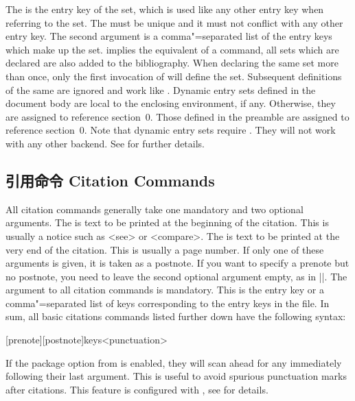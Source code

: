 \begin{ltxsyntax}

\BiberOnlyMark

The  is the entry key of the set, which is used like any other entry key when referring to the set. The  must be unique and it must not conflict with any other entry key. The second argument is a comma"=separated list of the entry keys which make up the set.  implies the equivalent of a  command, \ie all sets which are declared are also added to the bibliography. When declaring the same set more than once, only the first invocation of  will define the set. Subsequent definitions of the same  are ignored and work like . Dynamic entry sets defined in the document body are local to the enclosing  environment, if any. Otherwise, they are assigned to reference section~0. Those defined in the preamble are assigned to reference section~0. Note that dynamic entry sets require \biber. They will not work with any other backend. See  for further details.

\end{ltxsyntax}

\subsection{引用命令 Citation Commands}
\label{use:cit}

All citation commands generally take one mandatory and two optional arguments. The  is text to be printed at the beginning of the citation. This is usually a notice such as <see> or <compare>. The  is text to be printed at the very end of the citation. This is usually a page number. If only one of these arguments is given, it is taken as a postnote. If you want to specify a prenote but no postnote, you need to leave the second optional argument empty, as in |\cite[see][]{key}|. The  argument to all citation commands is mandatory. This is the entry key or a comma"=separated list of keys corresponding to the entry keys in the  file. In sum, all basic citations commands listed further down have the following syntax:

\begin{ltxsyntax}

[prenote][postnote]{keys}<punctuation>

If the  package option from  is enabled, they will scan ahead for any  immediately following their last argument. This is useful to avoid spurious punctuation marks after citations. This feature is configured with , see  for details.

\end{ltxsyntax}

